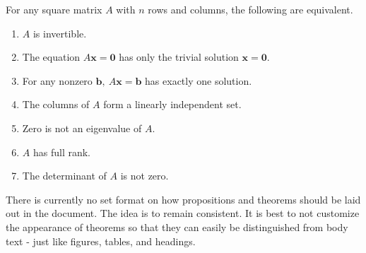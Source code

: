 \begin{thm}
	For any square matrix $A$ with $n$ rows and columns, the following are equivalent.
	\begin{enumerate}
		\item $A$ is invertible.
		\item The equation $A\mathbf{x}=\mathbf{0}$ has only the trivial solution $\mathbf{x} = \mathbf{0}.$
		\item For any nonzero $\mathbf{b}, \ A\mathbf{x} = \mathbf{b}$ has exactly one solution.
		\item The columns of $A$ form a linearly independent set.
		\item Zero is not an eigenvalue of $A$.
		\item $A$ has full rank.
		\item The determinant of $A$ is not zero.
	\end{enumerate}
\end{thm}

There is currently no set format on how propositions and theorems should be laid out in the document. The idea is to remain consistent. It is best to not customize the appearance of theorems so that they can easily be distinguished from body text - just like figures, tables, and headings.

